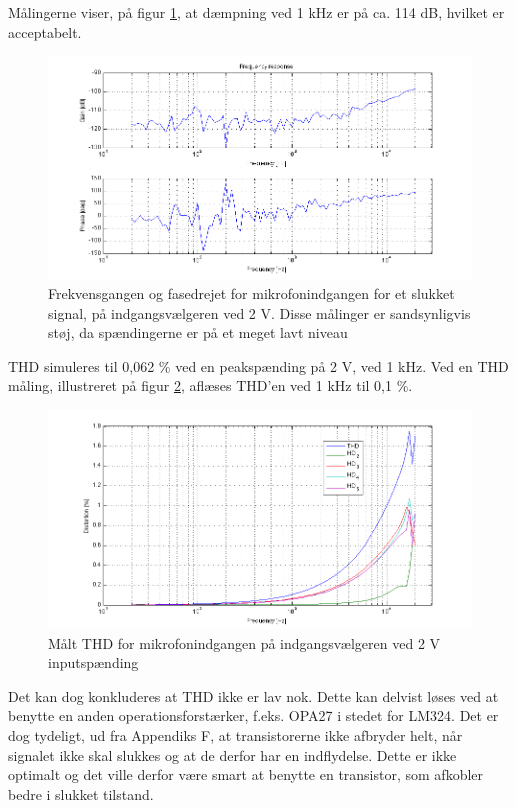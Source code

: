 Målingerne viser, på figur \ref{fig:indaccept:slukketmaaling}, at dæmpning ved 1 kHz er på ca. 114 dB, hvilket er acceptabelt. 
\begin{figure}[h]
\centering
\includegraphics[width=\textwidth]{maalerapporter/indgangsvaelger/Indgangsvlger-mic-2v-slukket-frek.png}
\caption{Frekvensgangen og fasedrejet for mikrofonindgangen for et slukket signal, på indgangsvælgeren ved 2 V. Disse målinger er sandsynligvis støj, da spændingerne er på et meget lavt niveau}
\label{fig:indaccept:slukketmaaling}
\end{figure}	

THD simuleres til 0,062 \% ved en peakspænding på 2 V, ved 1 kHz. Ved en THD måling, illustreret på figur \ref{fig:accind:thd2v}, aflæses THD'en ved 1 kHz til 0,1 \%. 
\begin{figure}[h]
\centering
\includegraphics[width=\textwidth]{maalerapporter/indgangsvaelger/Indgangsvlger-mic-2v-thd.png}
\caption{Målt THD for mikrofonindgangen på indgangsvælgeren ved 2 V inputspænding}
\label{fig:accind:thd2v}
\end{figure}
Det kan dog konkluderes at THD ikke er lav nok. Dette kan delvist løses ved at benytte en anden operationsforstærker, f.eks. OPA27 i stedet for LM324. Det er dog tydeligt, ud fra Appendiks F, at transistorerne ikke afbryder helt, når signalet ikke skal slukkes og at de derfor har en indflydelse. Dette er ikke optimalt og det ville derfor være smart at benytte en transistor, som afkobler bedre i slukket tilstand.
